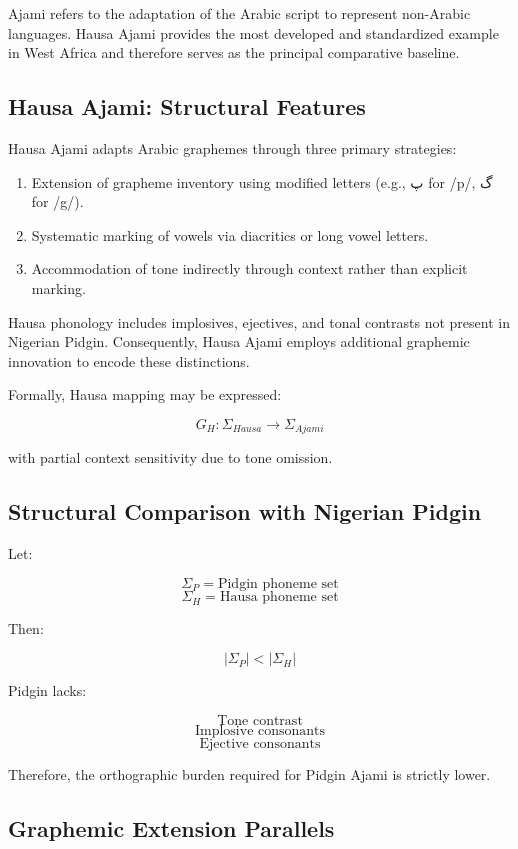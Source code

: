 \documentclass[12pt]{article}
\begin{document}
Ajami refers to the adaptation of the Arabic script to represent non-Arabic languages. Hausa Ajami provides the most developed and standardized example in West Africa and therefore serves as the principal comparative baseline.

\subsection{Hausa Ajami: Structural Features}

Hausa Ajami adapts Arabic graphemes through three primary strategies:

\begin{enumerate}
\item Extension of grapheme inventory using modified letters (e.g., پ for /p/, گ for /g/).
\item Systematic marking of vowels via diacritics or long vowel letters.
\item Accommodation of tone indirectly through context rather than explicit marking.
\end{enumerate}

Hausa phonology includes implosives, ejectives, and tonal contrasts not present in Nigerian Pidgin. Consequently, Hausa Ajami employs additional graphemic innovation to encode these distinctions.

Formally, Hausa mapping may be expressed:

\[
G_H : \Sigma_{Hausa} \rightarrow \Sigma_{Ajami}
\]

with partial context sensitivity due to tone omission.

\subsection{Structural Comparison with Nigerian Pidgin}

Let:

\[
\Sigma_P = \text{Pidgin phoneme set}
\]
\[
\Sigma_H = \text{Hausa phoneme set}
\]

Then:

\[
|\Sigma_P| < |\Sigma_H|
\]

Pidgin lacks:

\[
\text{Tone contrast}
\]
\[
\text{Implosive consonants}
\]
\[
\text{Ejective consonants}
\]

Therefore, the orthographic burden required for Pidgin Ajami is strictly lower.

\subsection{Graphemic Extension Parallels}
\end{document}
